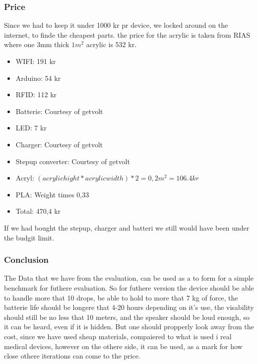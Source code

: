 \subsubsection{Price}
Since we had to keep it under 1000 kr pr device, we locked around on the internet, to finde the cheapest parts.
the price for the acrylic is taken from RIAS \cite{RIAS} where one 3mm thick $1 m^2$ acrylic is 532 kr.
\begin{itemize} \itemsep0em
	 \item WIFI: 191 kr \cite{Adafruit}
	 \item Arduino: 54 kr \cite{Sparkfun}
	 \item RFID: 112 kr \cite{Let-Eletronik}
	 \item Batterie: Courtesy of getvolt  \cite{Getvolt}
	 \item LED: 7 kr \cite{Adafruit}
	 \item Charger: Courtesy of getvolt \cite{Getvolt}
	 \item Stepup converter: Courtesy of getvolt  \cite{Getvolt}
	 \item Acryl: $(acrylic hight * acrylic width)*2 = 0,2 m^2 = 106.4 kr $ \cite{RIAS}
	 \item PLA: Weight times 0,33 
	 \item Total: 470,4 kr
\end{itemize}
If we had bought the stepup, charger and batteri we still would have been under the budgit limit.

\subsubsection{Conclusion}
The Data that we have from the evaluation, can be used as a to form for a simple benchmark for futhere evaluation.
So for futhere version the device should be able to handle more that 10 drops, be able to hold to more that 7 kg of force, the batterie life should be longere that 4-20 hours depending on it's use, the visability should still be no less that 10 meters, and the speaker should be loud enough, so it can be heard, even if it is hidden.
But one should propperly look away from the cost, since we have used sheap materials, compaiered to what is used i real medical devices, however on the othere side, it can be used, as a mark for how close othere iterations can come to the price.